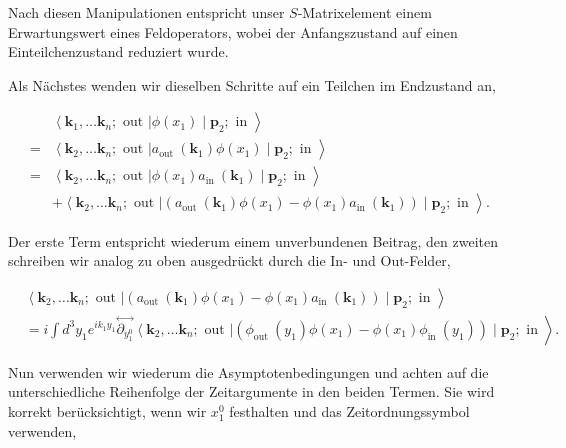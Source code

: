 \documentclass[10pt, letterpaper]{article}
\begin{document}
Nach diesen Manipulationen entspricht unser $S$-Matrixelement einem Erwartungswert eines Feldoperators, wobei der Anfangszustand auf einen Einteilchenzustand reduziert wurde.

Als Nächstes wenden wir dieselben Schritte auf ein Teilchen im Endzustand an,

$$
\begin{aligned}
& \left.\left\langle\mathbf{k}_{1}, \ldots \mathbf{k}_{n} ; \text { out }\right| \phi\left(x_{1}\right) \mid \mathbf{p}_{2} ; \text { in }\right\rangle \\
= & \left.\left\langle\mathbf{k}_{2}, \ldots \mathbf{k}_{n} ; \text { out }\right| a_{\text {out }}\left(\mathbf{k}_{1}\right) \phi\left(x_{1}\right) \mid \mathbf{p}_{2} ; \text { in }\right\rangle \\
= & \left.\left\langle\mathbf{k}_{2}, \ldots \mathbf{k}_{n} ; \text { out }\right| \phi\left(x_{1}\right) a_{\text {in }}\left(\mathbf{k}_{1}\right) \mid \mathbf{p}_{2} ; \text { in }\right\rangle \\
& \left.+\left\langle\mathbf{k}_{2}, \ldots \mathbf{k}_{n} ; \text { out }\right|\left(a_{\text {out }}\left(\mathbf{k}_{1}\right) \phi\left(x_{1}\right)-\phi\left(x_{1}\right) a_{\text {in }}\left(\mathbf{k}_{1}\right)\right) \mid \mathbf{p}_{2} ; \text { in }\right\rangle .
\end{aligned}
$$

Der erste Term entspricht wiederum einem unverbundenen Beitrag, den zweiten schreiben wir analog zu oben ausgedrückt durch die In- und Out-Felder,

$$
\begin{aligned}
& \left.\left\langle\mathbf{k}_{2}, \ldots \mathbf{k}_{n} ; \text { out }\right|\left(a_{\text {out }}\left(\mathbf{k}_{1}\right) \phi\left(x_{1}\right)-\phi\left(x_{1}\right) a_{\text {in }}\left(\mathbf{k}_{1}\right)\right) \mid \mathbf{p}_{2} ; \text { in }\right\rangle \\
& \left.=i \int d^{3} y_{1} e^{i k_{1} y_{1}} \stackrel{\leftrightarrow}{\partial_{y_{1}^{0}}}\left\langle\mathbf{k}_{2}, \ldots \mathbf{k}_{n} ; \text { out }\right|\left(\phi_{\text {out }}\left(y_{1}\right) \phi\left(x_{1}\right)-\phi\left(x_{1}\right) \phi_{\text {in }}\left(y_{1}\right)\right) \mid \mathbf{p}_{2} ; \text { in }\right\rangle .
\end{aligned}
$$

Nun verwenden wir wiederum die Asymptotenbedingungen und achten auf die unterschiedliche Reihenfolge der Zeitargumente in den beiden Termen. Sie wird korrekt berücksichtigt, wenn wir $x_{1}^{0}$ festhalten und das Zeitordnungssymbol verwenden,
\end{document}
